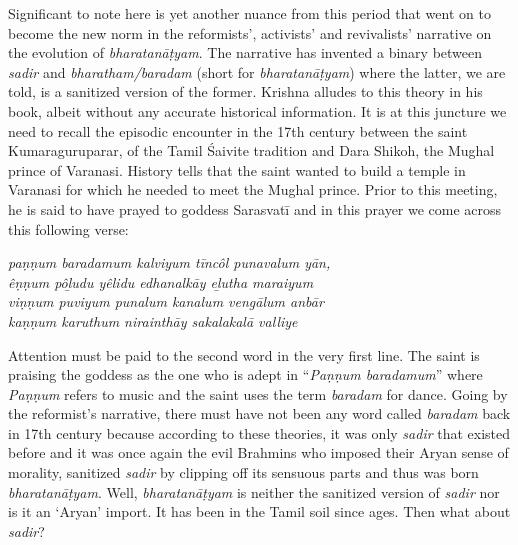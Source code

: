Significant to note here is yet another nuance from this period that went on to become the new norm in the reformists’, activists’ and revivalists’ narrative on the evolution of \textit{bharatanāṭyam}. The narrative has invented a binary between \textit{sadir} and \textit{bharatham/baradam }(short for\textit{ bharatanāṭyam}) where the latter, we are told, is a sanitized version of the former. Krishna alludes to this theory in his book, albeit without any accurate historical information. It is at this juncture we need to recall the episodic encounter in the 17th century between the saint Kumaraguruparar, of the Tamil Śaivite tradition and Dara Shikoh, the Mughal prince of Varanasi. History tells that the saint wanted to build a temple in Varanasi for which he needed to meet the Mughal prince. Prior to this meeting, he is said to have prayed to goddess Sarasvatī and in this prayer we come across this following verse:

\begin{myquote}
\textit{paṇṇum baradamum kalviyum tīncôl punavalum yān,}\\\textit{êṇṇum pôḻudu yêlidu edhanalkāy eḻutha maraiyum}\\\textit{viṇṇum puviyum punalum kanalum vengālum anbār}\\\textit{kaṇṇum karuthum nirainthāy sakalakalā valliye}
\end{myquote}

\begin{myquote}
\end{myquote}

Attention must be paid to the second word in the very first line. The saint is praising the goddess as the one who is adept in “\textit{Paṇṇum baradamum}” where \textit{Paṇṇum} refers to music and the saint uses the term \textit{baradam} for dance. Going by the reformist’s narrative, there must have not been any word called \textit{baradam} back in 17th century because according to these theories, it was only \textit{sadir} that existed before and it was once again the evil Brahmins who imposed their Aryan sense of morality, sanitized \textit{sadir} by clipping off its sensuous parts and thus was born \textit{bharatanāṭyam}. Well, \textit{bharatanāṭyam} is neither the sanitized version of \textit{sadir} nor is it an ‘Aryan’ import. It has been in the Tamil soil since ages. Then what about \textit{sadir}?

